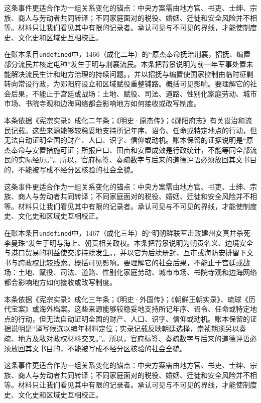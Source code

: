 这条事件更适合作为一组关系变化的锚点：中央方案需由地方官、书吏、士绅、宗族、商人与劳动者共同转译；不同家庭面对的税役、婚姻、迁徙和安全风险并不相等。材料只让我们看见其中有限的记录者。承认可见与不可见的界线，才能使制度史、文化史和区域史互相校正。

在账本条目\texttt{undefined}中，1466（成化二年）的“原杰奉命抚治荆襄，招抚、编置部分流民并核定屯种”发生于明与荆襄流民。本条把背景说明为前一年军事处置未能解决流民生计和地方治理的持续问题。，并以招抚与编置使国家控制由临时征剿转向常设行政，为郧阳府设立和区域赋役重整铺路。概括可见影响。要理解它的社会后果，不能止于宫廷或战场：土地、赋役、司法、道路、性别化家庭劳动、城市市场、书院寺观和边海网络都会影响地方如何接收或改写制度。

本条依据《宪宗实录》成化二年条；《明史·原杰传》；《郧阳府志》有关设治和流民记载。这些来源能够较稳妥地支持所记年序、诏令、任命或特定地点的行动，但无法自动证明全国的财产、人口、识字、信仰或动机。账本保留的证据说明是“原杰奉命与安置措施可证；所报户口、田亩和安置成效是行政统计，不能等同全部流民的实际经历。”。所以，官府标签、奏疏数字与后来的道德评语必须放回其文书目的，不能被写成不经分区核验的社会全貌。

这条事件更适合作为一组关系变化的锚点：中央方案需由地方官、书吏、士绅、宗族、商人与劳动者共同转译；不同家庭面对的税役、婚姻、迁徙和安全风险并不相等。材料只让我们看见其中有限的记录者。承认可见与不可见的界线，才能使制度史、文化史和区域史互相校正。

在账本条目\texttt{undefined}中，1467（成化三年）的“明朝鲜联军击败建州女真并杀死李曼珠”发生于明与海上、朝贡相关政权。本条把背景说明为朝贡名义、边境安全与港口贸易的利益使交涉持续发生。，并以它为后续册封、互市或海防安排留下文书与跨政权比较线索。概括可见影响。要理解它的社会后果，不能止于宫廷或战场：土地、赋役、司法、道路、性别化家庭劳动、城市市场、书院寺观和边海网络都会影响地方如何接收或改写制度。

本条依据《宪宗实录》成化三年条；《明史·外国传》；《朝鲜王朝实录》、琉球《历代宝案》或海外档案。这些来源能够较稳妥地支持所记年序、诏令、任命或特定地点的行动，但无法自动证明全国的财产、人口、识字、信仰或动机。账本保留的证据说明是“译写候选以编年材料定位；实录记载反映朝廷选择，崇祯期须另以奏疏、地方及敌对政权材料交叉。”。所以，官府标签、奏疏数字与后来的道德评语必须放回其文书目的，不能被写成不经分区核验的社会全貌。

这条事件更适合作为一组关系变化的锚点：中央方案需由地方官、书吏、士绅、宗族、商人与劳动者共同转译；不同家庭面对的税役、婚姻、迁徙和安全风险并不相等。材料只让我们看见其中有限的记录者。承认可见与不可见的界线，才能使制度史、文化史和区域史互相校正。

